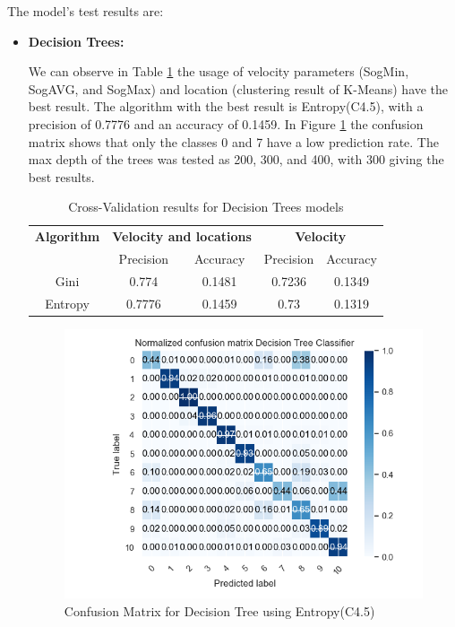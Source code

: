 The model's test results are:
\newpage
\begin{itemize}
\item \textbf{ Decision Trees: }

We can observe in Table \ref{table:cross_val_dt} the usage of velocity parameters (SogMin, SogAVG, and SogMax) and location (clustering result of K-Means) have the best result. The algorithm with the best result is Entropy(C4.5), with a precision of 0.7776 and an accuracy of 0.1459. In Figure \ref{table:cross_val_dt} the confusion matrix shows that only the classes 0 and 7 have a low prediction rate. The max depth of the trees was tested as 200, 300, and 400, with 300 giving the best results.


\begin {table}[H]
\begin{center}
\begin{tabular}{c|c|c|c|c}
\multicolumn{1}{c|}{\textbf{Algorithm } } &\multicolumn{2}{c|}{\textbf{ Velocity and locations}}& \multicolumn{2}{c}{\textbf{ Velocity}}\\
&Precision & Accuracy & Precision & Accuracy \\
\hline
Gini &0.774&0.1481&0.7236&0.1349\\
Entropy&0.7776&0.1459&0.73&0.1319
\label{table:cross_val_dt}
\end{tabular}
\caption {Cross-Validation results for Decision Trees models}
\end{center}
\end {table}

\begin{figure}[h]
\centering
\includegraphics[width=0.8\linewidth]{Chapters/img/CM_DT.png}
\caption{Confusion Matrix for Decision Tree using Entropy(C4.5)}
\label{fig:cm_dt}
\end{figure}



\end{itemize}
